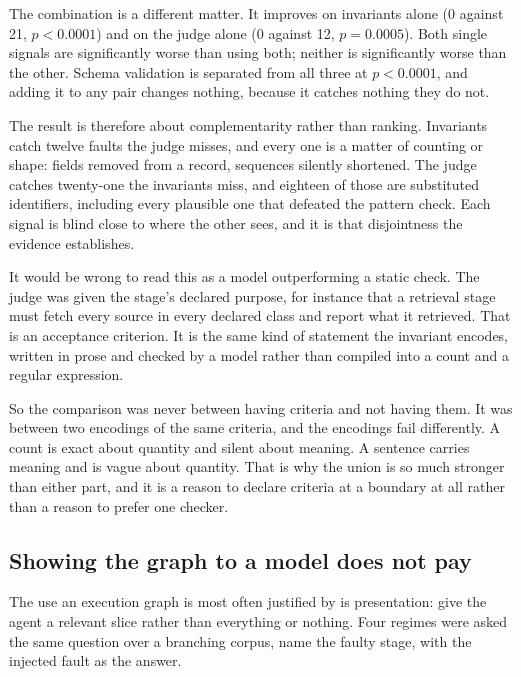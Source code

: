 The combination is a different matter. It improves on invariants alone (0 against 21,
$p<0.0001$) and on the judge alone (0 against 12, $p=0.0005$). Both single signals are
significantly worse than using both; neither is significantly worse than the other.
Schema validation is separated from all three at $p<0.0001$, and adding it to any pair
changes nothing, because it catches nothing they do not.

The result is therefore about complementarity rather than ranking. Invariants catch
twelve faults the judge misses, and every one is a matter of counting or shape: fields
removed from a record, sequences silently shortened. The judge catches twenty-one the
invariants miss, and eighteen of those are substituted identifiers, including every
plausible one that defeated the pattern check. Each signal is blind close to where the
other sees, and it is that disjointness the evidence establishes.

It would be wrong to read this as a model outperforming a static check. The judge was
given the stage's declared purpose, for instance that a retrieval stage must fetch every
source in every declared class and report what it retrieved. That is an acceptance
criterion. It is the same kind of statement the invariant encodes, written in prose and
checked by a model rather than compiled into a count and a regular expression.

So the comparison was never between having criteria and not having them. It was between
two encodings of the same criteria, and the encodings fail differently. A count is exact
about quantity and silent about meaning. A sentence carries meaning and is vague about
quantity. That is why the union is so much stronger than either part, and it is a reason
to declare criteria at a boundary at all rather than a reason to prefer one checker.

\subsection{Showing the graph to a model does not pay}
\label{sec:show}

The use an execution graph is most often justified by is presentation: give the agent a
relevant slice rather than everything or nothing. Four regimes were asked the same
question over a branching corpus, name the faulty stage, with the injected fault as the
answer.


